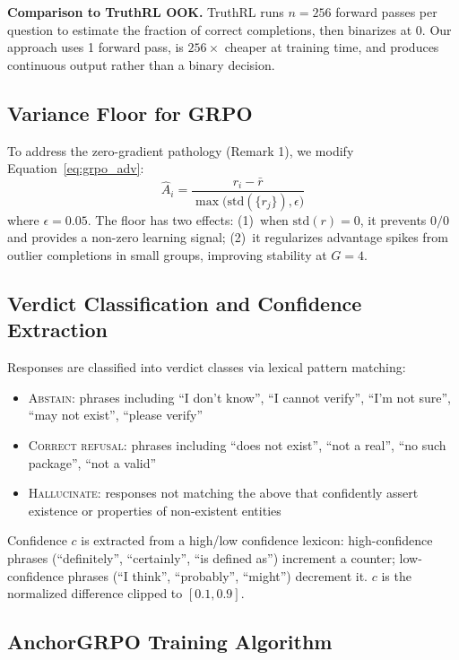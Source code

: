 \documentclass[11pt]{article}
\begin{document}
\textbf{Comparison to TruthRL OOK.} TruthRL runs $n=256$ forward passes per question to estimate the fraction of correct completions, then binarizes at 0. Our approach uses 1 forward pass, is $256\times$ cheaper at training time, and produces continuous output rather than a binary decision.

\subsection{Variance Floor for GRPO}
\label{sec:vfloor}

To address the zero-gradient pathology (Remark 1), we modify Equation~\eqref{eq:grpo_adv}:
\begin{equation}
\hat{A}_i = \frac{r_i - \bar{r}}{\max\bigl(\text{std}(\{r_j\}), \epsilon\bigr)}
\label{eq:vfloor}
\end{equation}
where $\epsilon = 0.05$. The floor has two effects: (1)~when $\text{std}(r) = 0$, it prevents $0/0$ and provides a non-zero learning signal; (2)~it regularizes advantage spikes from outlier completions in small groups, improving stability at $G=4$.

\subsection{Verdict Classification and Confidence Extraction}

Responses are classified into verdict classes via lexical pattern matching:
\begin{itemize}
    \item \textsc{Abstain}: phrases including ``I don't know'', ``I cannot verify'', ``I'm not sure'', ``may not exist'', ``please verify''
    \item \textsc{Correct refusal}: phrases including ``does not exist'', ``not a real'', ``no such package'', ``not a valid''
    \item \textsc{Hallucinate}: responses not matching the above that confidently assert existence or properties of non-existent entities
\end{itemize}
Confidence $c$ is extracted from a high/low confidence lexicon: high-confidence phrases (``definitely'', ``certainly'', ``is defined as'') increment a counter; low-confidence phrases (``I think'', ``probably'', ``might'') decrement it. $c$ is the normalized difference clipped to $[0.1, 0.9]$.

\subsection{AnchorGRPO Training Algorithm}
\end{document}
